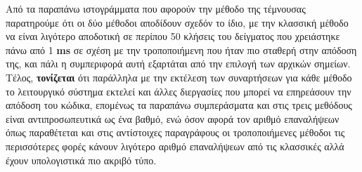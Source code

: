 \documentclass[First Project.tex]{subfiles}
\begin{document}
\vspace{5mm}
\begin{figure}[h!]
    \centering
    \quad
\end{figure}

Από τα παραπάνω ιστογράμματα που αφορούν την μέθοδο της τέμνουσας παρατηρούμε ότι οι δύο μέθοδοι αποδίδουν σχεδόν το ίδιο, με την κλασσική
μέθοδο να είναι λιγότερο αποδοτική σε περίπου 50 κλήσεις του δείγματος που χρειάστηκε πάνω από 1 \textlatin{\textbf{ms}} σε σχέση 
με την τροποποιήμενη που ήταν πιο σταθερή στην απόδοση της, και πάλι η συμπεριφορά αυτή εξαρτάται από την επιλογή των αρχικών σημείων. Τέλος,
\textbf{τονίζεται} ότι παράλληλα με την εκτέλεση των συναρτήσεων για κάθε μέθοδο το λειτουργικό σύστημα εκτελεί και άλλες διεργασίες που 
μπορεί να επηρεάσουν την απόδοση του κώδικα, επομένως τα παραπάνω συμπεράσματα και στις τρεις μεθόδους είναι αντιπροσωπευτικά ως ένα βαθμό, ενώ
όσον αφορά τον αριθμό επαναλήψεων όπως παραθέτεται και στις αντίστοιχες παραγράφους οι τροποποιήμενες μέθοδοι τις περισσότερες φορές κάνουν 
λιγότερο αριθμό επαναλήψεων από τις κλασσικές αλλά έχουν υπολογιστικά πιο ακριβό τύπο.
\newpage
\end{document}
